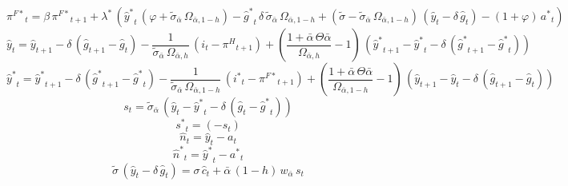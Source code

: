 \begin{dmath}
{{\pi^{F*}}}_{t}={{\beta}}\, {{\pi^{F*}}}_{t+1}+{{\lambda^*}}\, \left({{\hat y^*}}_{t}\, \left({{\varphi}}+{{\tilde\sigma_{\bar{\alpha}}}}\, {{\Omega_{\bar \alpha,1-h}}}\right)-{{\hat g^*}}_{t}\, {{\delta}}\, {{\tilde\sigma_{\bar{\alpha}}}}\, {{\Omega_{\bar \alpha,1-h}}}+\left({{\tilde{\sigma}}}-{{\tilde\sigma_{\bar{\alpha}}}}\, {{\Omega_{\bar \alpha,1-h}}}\right)\, \left({{\hat y}}_{t}-{{\delta}}\, {{\hat g}}_{t}\right)-\left(1+{{\varphi}}\right)\, {{a^*}}_{t}\right)
\end{dmath}
\begin{dmath}
{{\hat y}}_{t}={{\hat y}}_{t+1}-{{\delta}}\, \left({{\hat g}}_{t+1}-{{\hat g}}_{t}\right)-\frac{1}{{{\tilde\sigma_{\bar{\alpha}}}}\, {{\Omega_{\bar \alpha,h}}}}\, \left({{i}}_{t}-{{\pi^H}}_{t+1}\right)+\left(\frac{1+{{\bar{\alpha}}}\, {{\Theta{\bar{\alpha}}}}}{{{\Omega_{\bar \alpha,h}}}}-1\right)\, \left({{\hat y^*}}_{t+1}-{{\hat y^*}}_{t}-{{\delta}}\, \left({{\hat g^*}}_{t+1}-{{\hat g^*}}_{t}\right)\right)
\end{dmath}
\begin{dmath}
{{\hat y^*}}_{t}={{\hat y^*}}_{t+1}-{{\delta}}\, \left({{\hat g^*}}_{t+1}-{{\hat g^*}}_{t}\right)-\frac{1}{{{\tilde\sigma_{\bar{\alpha}}}}\, {{\Omega_{\bar \alpha,1-h}}}}\, \left({{i^*}}_{t}-{{\pi^{F*}}}_{t+1}\right)+\left(\frac{1+{{\bar{\alpha}}}\, {{\Theta{\bar{\alpha}}}}}{{{\Omega_{\bar \alpha,1-h}}}}-1\right)\, \left({{\hat y}}_{t+1}-{{\hat y}}_{t}-{{\delta}}\, \left({{\hat g}}_{t+1}-{{\hat g}}_{t}\right)\right)
\end{dmath}
\begin{dmath}
{{s}}_{t}={{\tilde\sigma_{\bar{\alpha}}}}\, \left({{\hat y}}_{t}-{{\hat y^*}}_{t}-{{\delta}}\, \left({{\hat g}}_{t}-{{\hat g^*}}_{t}\right)\right)
\end{dmath}
\begin{dmath}
{{s^*}}_{t}=\left(-{{s}}_{t}\right)
\end{dmath}
\begin{dmath}
{{\hat n}}_{t}={{\hat y}}_{t}-{{a}}_{t}
\end{dmath}
\begin{dmath}
{{\hat n^*}}_{t}={{\hat y^*}}_{t}-{{a^*}}_{t}
\end{dmath}
\begin{dmath}
{{\tilde{\sigma}}}\, \left({{\hat y}}_{t}-{{\delta}}\, {{\hat g}}_{t}\right)={{\sigma}}\, {{\hat c}}_{t}+{{\bar{\alpha}}}\, \left(1-{{h}}\right)\, {{w_{\bar{\alpha}}}}\, {{s}}_{t}
\end{dmath}
